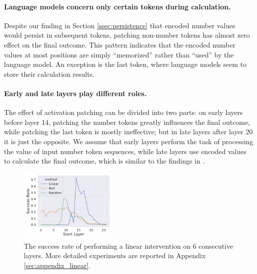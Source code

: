 \documentclass[11pt]{article}
\begin{document}
\paragraph{Language models concern only certain tokens during calculation.}
Despite our finding in Section \ref{ssec:persistence} that encoded number values would persist in subsequent tokens, patching non-number tokens has almost zero effect on the final outcome. 
This pattern indicates that the encoded number values at most positions are simply ``memorized'' rather than  ``used'' by the language model.
An exception is the last token, where language models seem to store their calculation results.

\paragraph{Early and late layers play different roles.}
The effect of activation patching can be divided into two parts: 
on early layers before layer 14, patching the number tokens greatly influences the final outcome, while patching the last token is mostly ineffective; but in late layers after layer 20 it is just the opposite.
We assume that early layers perform the task of processing the value of input number token sequences, while late layers use encoded values to calculate the final outcome, which is similar to the findings in \citet{stolfo2023mechanistic}.

\begin{figure}[t]
    \centering
    \includegraphics[width=0.42\textwidth]{figures/intervene/null_comparison.pdf}
    \caption{The success rate of performing a linear intervention on 6 consecutive layers. More detailed experiments are reported in Appendix \ref{sec:appendix_linear}.}
    \label{fig:intervene_linear}
\end{figure}
\end{document}
